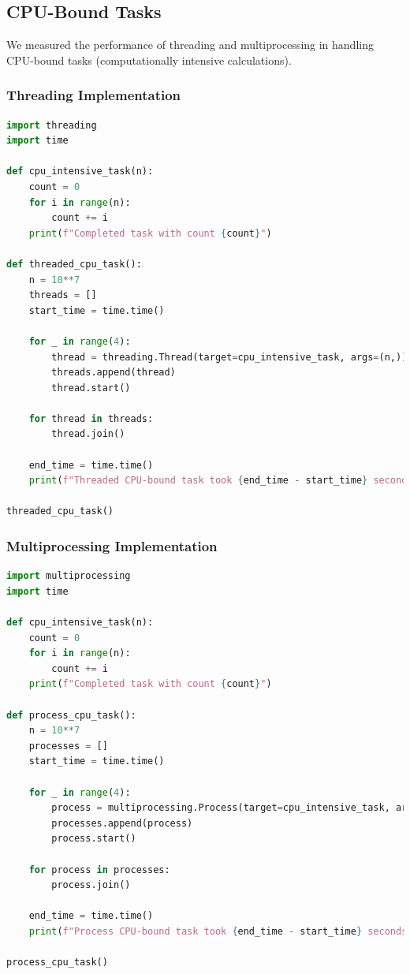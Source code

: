\documentclass[onecolumn]{article}
\begin{document}
\subsection{CPU-Bound Tasks}
We measured the performance of threading and multiprocessing in handling CPU-bound tasks (computationally intensive calculations).

\subsubsection{Threading Implementation}
\begin{lstlisting}[language=Python, caption=Threaded CPU-bound Task]
import threading
import time

def cpu_intensive_task(n):
    count = 0
    for i in range(n):
        count += i
    print(f"Completed task with count {count}")

def threaded_cpu_task():
    n = 10**7
    threads = []
    start_time = time.time()

    for _ in range(4):
        thread = threading.Thread(target=cpu_intensive_task, args=(n,))
        threads.append(thread)
        thread.start()

    for thread in threads:
        thread.join()

    end_time = time.time()
    print(f"Threaded CPU-bound task took {end_time - start_time} seconds")

threaded_cpu_task()
\end{lstlisting}

\subsubsection{Multiprocessing Implementation}
\begin{lstlisting}[language=Python, caption=Process CPU-bound Task]
import multiprocessing
import time

def cpu_intensive_task(n):
    count = 0
    for i in range(n):
        count += i
    print(f"Completed task with count {count}")

def process_cpu_task():
    n = 10**7
    processes = []
    start_time = time.time()

    for _ in range(4):
        process = multiprocessing.Process(target=cpu_intensive_task, args=(n,))
        processes.append(process)
        process.start()

    for process in processes:
        process.join()

    end_time = time.time()
    print(f"Process CPU-bound task took {end_time - start_time} seconds")

process_cpu_task()
\end{lstlisting}
\end{document}

